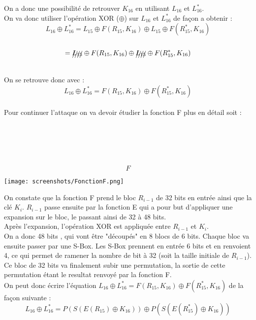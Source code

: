 \documentclass[a4paper,11pt]{article}
\begin{document}
	On a donc une possibilité de retrouver $K_{16}$ en utilisant $L_{16}$  et $L_{16}^{*}$.\\
	On va donc utiliser l'opération XOR ($\oplus$) sur $L_{16}$  et $L_{16}^{*}$ de façon a obtenir :\\
	$$L_{16}  \oplus L_{16}^{*} =  L_{15} \oplus F(R_{15}, K_{16}) \oplus  L_{15} \oplus F(R_{15}^{*}, K_{16}) $$\\
	                          $$= \xout{L_{15} } \oplus F(R_{15}, K_{16}) \oplus  \xout{L_{15} } \oplus F(R_{15}^{*}, K_{16})$$\\
	On se retrouve donc avec :\\
	$$L_{16}  \oplus L_{16}^{*} = F(R_{15}, K_{16}) \oplus F(R_{15}^{*}, K_{16})$$\\
	
	Pour continuer l'attaque on va devoir étudier la fonction F plus en détail soit :\\
	\\
	\\ \\ \\ \\ 
	$$F$$
	\begin{center}\texttt{[image: screenshots/FonctionF.png]}\end{center}
	On constate que la fonction F prend le bloc $R_{i - 1}$ de 32 bits en entrée ainsi que la clé $K_{i}$. $R_{i - 1}$ passe ensuite par la fonction  E qui a pour but d'appliquer une expansion sur le bloc, le passant ainsi de 32 à 48 bits.\\
	Après l'expansion, l'opération XOR est appliquée entre $R_{i - 1}$ et $K_{i}$.\\
	On a donc 48 bits , qui vont être "découpés" en 8 blocs de 6 bits. Chaque bloc va ensuite passer par une S-Box. Les S-Box prennent en entrée 6 bits et en renvoient 4, ce qui permet de ramener la nombre de bit à 32 (soit la taille initiale de $R_{i - 1}$).\\
	Ce bloc de 32 bits va finalement subir une permutation, la sortie de cette permutation étant le resultat renvoyé par la fonction F.\\
	On peut donc écrire l'équation $L_{16}  \oplus L_{16}^{*} = F(R_{15}, K_{16}) \oplus F(R_{15}^{*}, K_{16})$ de la façon suivante : \\
	$$L_{16}  \oplus L_{16}^{*} = P(S(E(R_{15})\oplus K_{16})) \oplus P(S(E(R_{15}^{*})\oplus K_{16}))$$
	
\end{document}
